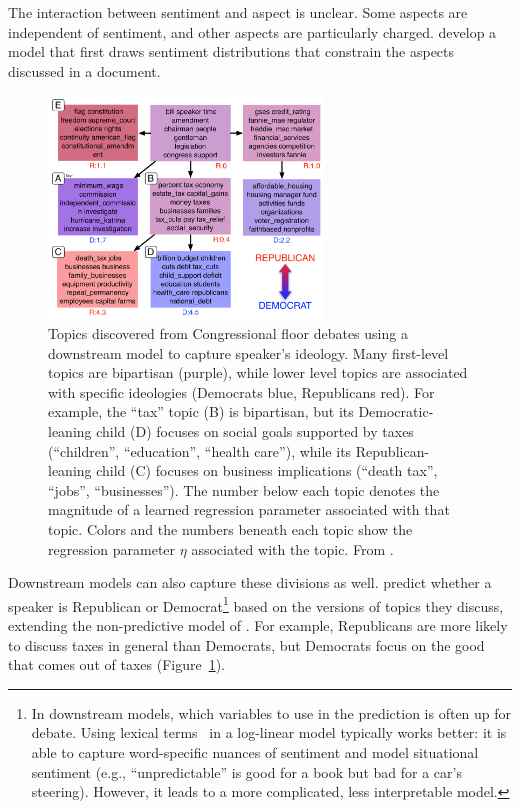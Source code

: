 The interaction between sentiment and aspect is unclear.  Some
aspects are independent of sentiment, and other aspects are
particularly charged.  \citet{jo-11} develop a model that first draws
sentiment distributions that constrain the aspects discussed in a
document.


\begin{figure}[t]
\begin{center}
    \includegraphics[width=0.65\textwidth]{figures/ideology_topics_vert}
\end{center}
    \caption{
       \small Topics discovered from Congressional floor debates using
       a downstream model to capture speaker's ideology.  Many
    first-level topics are bipartisan (purple), while lower level topics are
    associated with specific ideologies (Democrats blue, Republicans red). For example,
    	the ``tax'' topic (B) is bipartisan, but its Democratic-leaning child (D) focuses on
    	social goals supported by taxes (``children'', ``education'', ``health care''), while
    	its Republican-leaning child (C) focuses on business implications (``death tax'', ``jobs'',
    	``businesses'').  The number below each
    topic denotes the magnitude of a learned regression parameter associated
    with that topic.  Colors and the numbers beneath each topic show the
    regression parameter $\eta$ associated with the topic.  From \citet{nguyen-13:shlda}.
    } \label{fig:shlda-taxes}
\end{figure}

Downstream models can also capture these divisions as well.
\citet{nguyen-13:shlda} predict whether a speaker is Republican or
Democrat\footnote{In downstream models, which variables to use in the
  prediction is often up for debate.  Using lexical
  terms~\citep{titov-08,zhao-10} in a log-linear model typically works
  better: it is able to capture word-specific nuances of sentiment and
  model situational sentiment (e.g., ``unpredictable'' is good for a
  book but bad for a car's steering).  However, it leads to a more
  complicated, less interpretable model.} based on the versions of
topics they discuss, extending the non-predictive model of
\citet{grimmer-09}.  For example, Republicans are more likely to
discuss taxes in general than Democrats, but Democrats focus on the
good that comes out of taxes (Figure~\ref{fig:shlda-taxes}).

